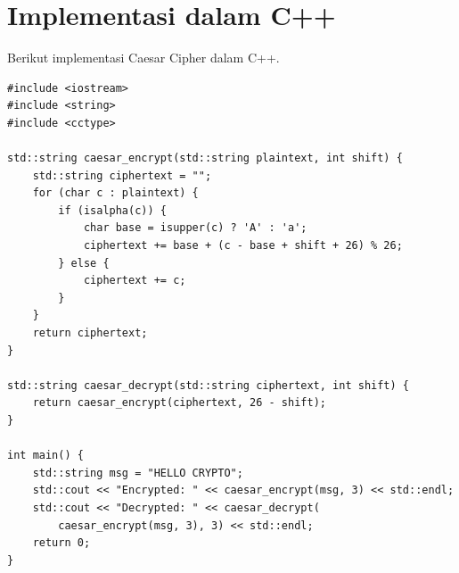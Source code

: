 \section{Implementasi dalam C++}

Berikut implementasi Caesar Cipher dalam C++.

\begin{lstlisting}[style=cppstyle,caption={Implementasi Caesar Cipher dalam C++}]
#include <iostream>
#include <string>
#include <cctype>

std::string caesar_encrypt(std::string plaintext, int shift) {
    std::string ciphertext = "";
    for (char c : plaintext) {
        if (isalpha(c)) {
            char base = isupper(c) ? 'A' : 'a';
            ciphertext += base + (c - base + shift + 26) % 26;
        } else {
            ciphertext += c;
        }
    }
    return ciphertext;
}

std::string caesar_decrypt(std::string ciphertext, int shift) {
    return caesar_encrypt(ciphertext, 26 - shift);
}

int main() {
    std::string msg = "HELLO CRYPTO";
    std::cout << "Encrypted: " << caesar_encrypt(msg, 3) << std::endl;
    std::cout << "Decrypted: " << caesar_decrypt(
        caesar_encrypt(msg, 3), 3) << std::endl;
    return 0;
}
\end{lstlisting}
